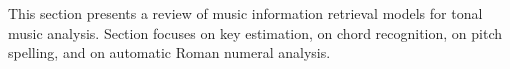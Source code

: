 

This section presents a review of music information retrieval models for tonal music analysis. Section  focuses on key estimation,  on chord recognition,  on pitch spelling, and  on automatic Roman numeral analysis.
